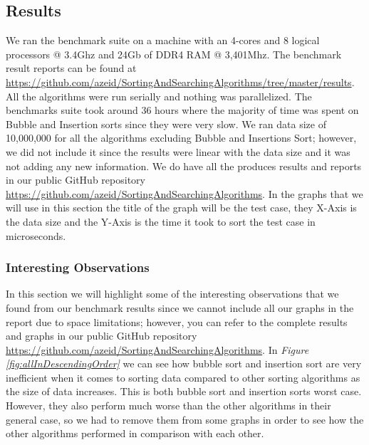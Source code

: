 \subsection{Results}

We ran the benchmark suite on a machine with an 4-cores and 8 logical processors @ 3.4Ghz and 24Gb of DDR4 RAM @ 3,401Mhz. The benchmark result reports can be found at \url{https://github.com/azeid/SortingAndSearchingAlgorithms/tree/master/results}. All the algorithms were run serially and nothing was parallelized. The benchmarks suite took around 36 hours where the majority of time was spent on Bubble and Insertion sorts since they were very slow. We ran data size of 10,000,000 for all the algorithms excluding Bubble and Insertions Sort; however, we did not include it since the results were linear with the data size and it was not adding any new information. We do have all the produces results and reports in our public GitHub repository \url{https://github.com/azeid/SortingAndSearchingAlgorithms}. In the graphs that we will use in this section the title of the graph will be the test case, they X-Axis is the data size and the Y-Axis is the time it took to sort the test case in microseconds.

\subsubsection{Interesting Observations}

In this section we will highlight some of the interesting observations that we found from our benchmark results since we cannot include all our graphs in the report due to space limitations; however, you can refer to the complete results and graphs in our public GitHub repository \url{https://github.com/azeid/SortingAndSearchingAlgorithms}. In \textit{Figure \ref{fig:allInDescendingOrder}} we can see how bubble sort and insertion sort are very inefficient when it comes to sorting data compared to other sorting algorithms as the size of data increases. This is both bubble sort and insertion sorts worst case. However, they also perform much worse than the other algorithms in their general case, so we had to remove them from some graphs in order to see how the other algorithms performed in comparison with each other.


